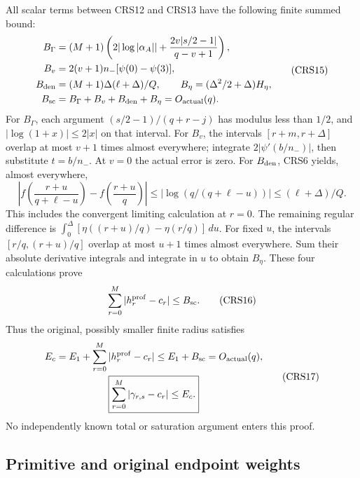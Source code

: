All scalar terms between CRS12 and CRS13 have the following
finite summed bound:
\[
\begin{split}
 B_\Gamma&=(M+1)
 \left(2|\log|\alpha_A||+\frac{2v|s/2-1|}{q-v+1}\right),\\
 B_v&=2(v+1)n_-[\psi(0)-\psi(3)],\\
 B_{\rm den}&=(M+1)\Delta(\ell+\Delta)/Q,\qquad
 B_\eta=(\Delta^2/2+\Delta)H_\eta,\\
 B_{\rm sc}&=B_\Gamma+B_v+B_{\rm den}+B_\eta
                                      =O_{\rm actual}(q).
\end{split}                                                    \tag{CRS15}
\]
For $B_\Gamma$, each argument $(s/2-1)/(q+r-j)$ has modulus
less than $1/2$, and $|\log(1+x)|\le2|x|$ on that interval.
For $B_v$, the intervals $[r+m,r+\Delta]$ overlap at most
$v+1$ times almost everywhere; integrate $2|\psi'(b/n_-)|$,
then substitute $t=b/n_-$. At $v=0$ the actual error is zero.
For $B_{\rm den}$, CRS6 yields, almost everywhere,
\[
 \left|f\left(\frac{r+u}{q+\ell-u}\right)
                    -f\left(\frac{r+u}{q}\right)\right|
 \le|\log(q/(q+\ell-u))|\le(\ell+\Delta)/Q .
\]
This includes the convergent limiting calculation at $r=0$.
The remaining regular difference is
$\int_0^\Delta[\eta((r+u)/q)-\eta(r/q)]\,du$.
For fixed $u$, the intervals $[r/q,(r+u)/q]$ overlap at most
$u+1$ times almost everywhere. Sum their absolute derivative
integrals and integrate in $u$ to obtain $B_\eta$.
These four calculations prove
\[
 \sum_{r=0}^M|h_r^{\rm prof}-c_r|\le B_{\rm sc}.        \tag{CRS16}
\]
Thus the original, possibly smaller finite radius satisfies
\[
\begin{gathered}
 E_c=E_1+\sum_{r=0}^M|h_r^{\rm prof}-c_r|
                 \le E_1+B_{\rm sc}=O_{\rm actual}(q),\\
 \boxed{\displaystyle\sum_{r=0}^M|\gamma_{r,s}-c_r|\le E_c.}
\end{gathered}                                                   \tag{CRS17}
\]
No independently known total or saturation argument enters this proof.

\subsection{Primitive and original endpoint weights}

